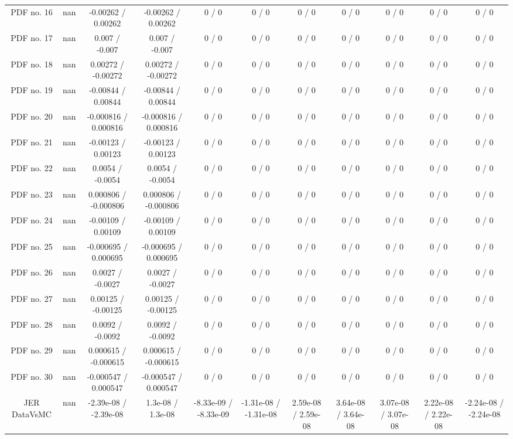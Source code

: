\begin{table}[htbp]
\begin{center}
\begin{tabular}{|c|c|c|c|c|c|c|c|c|c|c|}
  PDF no. 16 &    nan    & -0.00262 / 0.00262 & -0.00262 / 0.00262 & 0 / 0 & 0 / 0 & 0 / 0 & 0 / 0 & 0 / 0 & 0 / 0 & 0 / 0 \\ 
  PDF no. 17 &    nan    & 0.007 / -0.007 & 0.007 / -0.007 & 0 / 0 & 0 / 0 & 0 / 0 & 0 / 0 & 0 / 0 & 0 / 0 & 0 / 0 \\ 
  PDF no. 18 &    nan    & 0.00272 / -0.00272 & 0.00272 / -0.00272 & 0 / 0 & 0 / 0 & 0 / 0 & 0 / 0 & 0 / 0 & 0 / 0 & 0 / 0 \\ 
  PDF no. 19 &    nan    & -0.00844 / 0.00844 & -0.00844 / 0.00844 & 0 / 0 & 0 / 0 & 0 / 0 & 0 / 0 & 0 / 0 & 0 / 0 & 0 / 0 \\ 
  PDF no. 20 &    nan    & -0.000816 / 0.000816 & -0.000816 / 0.000816 & 0 / 0 & 0 / 0 & 0 / 0 & 0 / 0 & 0 / 0 & 0 / 0 & 0 / 0 \\ 
  PDF no. 21 &    nan    & -0.00123 / 0.00123 & -0.00123 / 0.00123 & 0 / 0 & 0 / 0 & 0 / 0 & 0 / 0 & 0 / 0 & 0 / 0 & 0 / 0 \\ 
  PDF no. 22 &    nan    & 0.0054 / -0.0054 & 0.0054 / -0.0054 & 0 / 0 & 0 / 0 & 0 / 0 & 0 / 0 & 0 / 0 & 0 / 0 & 0 / 0 \\ 
  PDF no. 23 &    nan    & 0.000806 / -0.000806 & 0.000806 / -0.000806 & 0 / 0 & 0 / 0 & 0 / 0 & 0 / 0 & 0 / 0 & 0 / 0 & 0 / 0 \\ 
  PDF no. 24 &    nan    & -0.00109 / 0.00109 & -0.00109 / 0.00109 & 0 / 0 & 0 / 0 & 0 / 0 & 0 / 0 & 0 / 0 & 0 / 0 & 0 / 0 \\ 
  PDF no. 25 &    nan    & -0.000695 / 0.000695 & -0.000695 / 0.000695 & 0 / 0 & 0 / 0 & 0 / 0 & 0 / 0 & 0 / 0 & 0 / 0 & 0 / 0 \\ 
  PDF no. 26 &    nan    & 0.0027 / -0.0027 & 0.0027 / -0.0027 & 0 / 0 & 0 / 0 & 0 / 0 & 0 / 0 & 0 / 0 & 0 / 0 & 0 / 0 \\ 
  PDF no. 27 &    nan    & 0.00125 / -0.00125 & 0.00125 / -0.00125 & 0 / 0 & 0 / 0 & 0 / 0 & 0 / 0 & 0 / 0 & 0 / 0 & 0 / 0 \\ 
  PDF no. 28 &    nan    & 0.0092 / -0.0092 & 0.0092 / -0.0092 & 0 / 0 & 0 / 0 & 0 / 0 & 0 / 0 & 0 / 0 & 0 / 0 & 0 / 0 \\ 
  PDF no. 29 &    nan    & 0.000615 / -0.000615 & 0.000615 / -0.000615 & 0 / 0 & 0 / 0 & 0 / 0 & 0 / 0 & 0 / 0 & 0 / 0 & 0 / 0 \\ 
  PDF no. 30 &    nan    & -0.000547 / 0.000547 & -0.000547 / 0.000547 & 0 / 0 & 0 / 0 & 0 / 0 & 0 / 0 & 0 / 0 & 0 / 0 & 0 / 0 \\ 
  JER DataVsMC &    nan    & -2.39e-08 / -2.39e-08 & 1.3e-08 / 1.3e-08 & -8.33e-09 / -8.33e-09 & -1.31e-08 / -1.31e-08 & 2.59e-08 / 2.59e-08 & 3.64e-08 / 3.64e-08 & 3.07e-08 / 3.07e-08 & 2.22e-08 / 2.22e-08 & -2.24e-08 / -2.24e-08 \\ 

\end{tabular}
\end{center}
\end{table}
